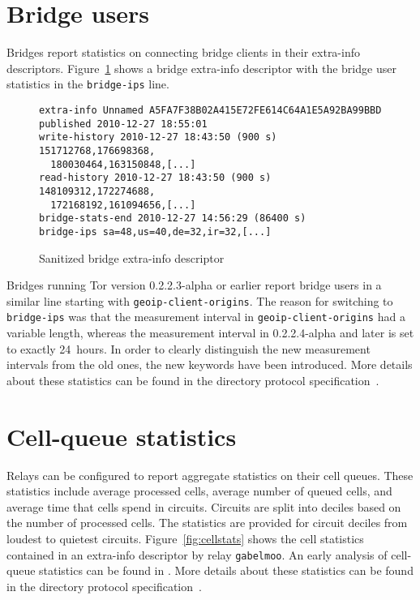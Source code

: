 \documentclass{article}
\begin{document}
\section{Bridge users}

Bridges report statistics on connecting bridge clients in their extra-info
descriptors.
Figure~\ref{fig:bridgeextrainfo} shows a bridge extra-info descriptor
with the bridge user statistics in the \verb+bridge-ips+ line.

\begin{figure}
\begin{verbatim}
extra-info Unnamed A5FA7F38B02A415E72FE614C64A1E5A92BA99BBD
published 2010-12-27 18:55:01
write-history 2010-12-27 18:43:50 (900 s) 151712768,176698368,
  180030464,163150848,[...]
read-history 2010-12-27 18:43:50 (900 s) 148109312,172274688,
  172168192,161094656,[...]
bridge-stats-end 2010-12-27 14:56:29 (86400 s)
bridge-ips sa=48,us=40,de=32,ir=32,[...]
\end{verbatim}
\vspace{-1em}
\caption{Sanitized bridge extra-info descriptor}
\label{fig:bridgeextrainfo}
\end{figure}

Bridges running Tor version 0.2.2.3-alpha or earlier report bridge users
in a similar line starting with \verb+geoip-client-origins+.
The reason for switching to \verb+bridge-ips+ was that the measurement
interval in \verb+geoip-client-origins+ had a variable length, whereas the
measurement interval in 0.2.2.4-alpha and later is set to exactly
24~hours.
In order to clearly distinguish the new measurement intervals from the old
ones, the new keywords have been introduced.
More details about these statistics can be found in the directory protocol
specification~\cite{dirspec}.

\section{Cell-queue statistics}

Relays can be configured to report aggregate statistics on their cell
queues.
These statistics include average processed cells, average number of queued
cells, and average time that cells spend in circuits.
Circuits are split into deciles based on the number of processed cells.
The statistics are provided for circuit deciles from loudest to quietest
circuits.
Figure~\ref{fig:cellstats} shows the cell statistics contained in an
extra-info descriptor by relay \texttt{gabelmoo}.
An early analysis of cell-queue statistics can be found in
\cite{loesing2009analysis}.
More details about these statistics can be found in the directory protocol
specification~\cite{dirspec}.
\end{document}

